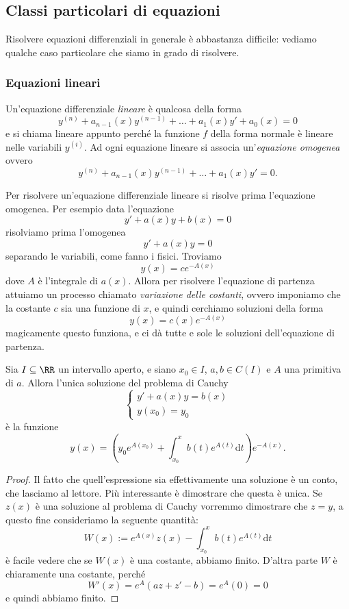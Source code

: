 \documentclass[11pt]{scrartcl}
\newcommand{\dif}{\text{d}}
\begin{document}
	\subsection{Classi particolari di equazioni}
	Risolvere equazioni differenziali in generale è abbastanza difficile: vediamo qualche caso particolare che siamo in grado di risolvere.
	
	\subsubsection{Equazioni lineari}
	\begin{definition}
		Un'equazione differenziale \textit{lineare} è qualcosa della forma
		$$y^{(n)}+a_{n-1}(x)y^{(n-1)}+\dots+a_1(x)y'+a_0(x)=0$$
		e si chiama lineare appunto perché la funzione $f$ della forma normale è lineare nelle variabili $y^{(i)}$. Ad ogni equazione lineare si associa un'\textit{equazione omogenea} ovvero 
		$$y^{(n)}+a_{n-1}(x)y^{(n-1)}+\dots+a_1(x)y'=0.$$
	\end{definition}
	Per risolvere un'equazione differenziale lineare si risolve prima l'equazione omogenea. Per esempio data l'equazione
	$$y'+a(x)y+b(x)=0$$
	risolviamo prima l'omogenea
	$$y'+a(x)y=0$$
	separando le variabili, come fanno i fisici. Troviamo
	$$y(x)=ce^{-A(x)}$$
	dove $A$ è l'integrale di $a(x)$. Allora per risolvere l'equazione di partenza attuiamo un processo chiamato \textit{variazione delle costanti}, ovvero imponiamo che la costante $c$ sia una funzione di $x$, e quindi cerchiamo soluzioni della forma
	$$y(x)=c(x)e^{-A(x)}$$
	magicamente questo funziona, e ci dà tutte e sole le soluzioni dell'equazione di partenza.
	\begin{theorem}
		Sia $I\subseteq\RR$ un intervallo aperto, e siano $x_0\in I$, $a,b\in C(I)$ e $A$ una primitiva di $a$. Allora l'unica soluzione del problema di Cauchy
		$$
		\begin{cases}
			y'+a(x)y=b(x) \\
			y(x_0)=y_0
		\end{cases}
		$$
		è la funzione
		$$y(x)=\left(y_0e^{A(x_0)}+\int_{x_0}^x b(t)e^{A(t)}\dif t\right)e^{-A(x)}.$$
	\end{theorem}
	\begin{proof}
		Il fatto che quell'espressione sia effettivamente una soluzione è un conto, che lasciamo al lettore. Più interessante è dimostrare che questa è unica. Se $z(x)$ è una soluzione al problema di Cauchy vorremmo dimostrare che $z=y$, a questo fine consideriamo la seguente quantità:
		$$W(x):=e^{A(x)}z(x)-\int_{x_0}^x b(t)e^{A(t)}\dif t$$
		è facile vedere che se $W(x)$ è una costante, abbiamo finito. D'altra parte $W$ è chiaramente una costante, perché
		$$W'(x)=e^A(az+z'-b)=e^A (0)=0$$
		e quindi abbiamo finito. 
	\end{proof}
\end{document}

